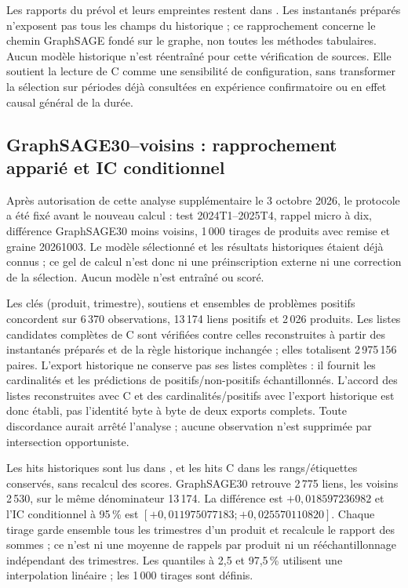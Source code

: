 Les rapports du prévol et leurs empreintes restent dans . Les instantanés préparés n'exposent pas tous les champs du  historique ; ce rapprochement concerne le chemin GraphSAGE fondé sur le graphe, non toutes les méthodes tabulaires. Aucun modèle historique n'est réentraîné pour cette vérification de sources. Elle soutient la lecture de C comme une sensibilité de configuration, sans transformer la sélection sur périodes déjà consultées en expérience confirmatoire ou en effet causal général de la durée.

\subsection{GraphSAGE30--voisins : rapprochement apparié et IC conditionnel}

Après autorisation de cette analyse supplémentaire le 3 octobre 2026, le protocole a été fixé avant le nouveau calcul : test 2024T1--2025T4, rappel micro à dix, différence GraphSAGE30 moins voisins, 1\,000 tirages de produits avec remise et graine 20261003. Le modèle sélectionné et les résultats historiques étaient déjà connus ; ce gel de calcul n'est donc ni une préinscription externe ni une correction de la sélection. Aucun modèle n'est entraîné ou scoré.

Les clés (produit, trimestre), soutiens et ensembles de problèmes positifs concordent sur 6\,370 observations, 13\,174 liens positifs et 2\,026 produits. Les listes candidates complètes de C sont vérifiées contre celles reconstruites à partir des instantanés préparés et de la règle historique inchangée ; elles totalisent 2\,975\,156 paires. L'export historique ne conserve pas ses listes complètes : il fournit les cardinalités et les prédictions de positifs/non-positifs échantillonnés. L'accord des listes reconstruites avec C et des cardinalités/positifs avec l'export historique est donc établi, pas l'identité byte à byte de deux exports complets. Toute discordance aurait arrêté l'analyse ; aucune observation n'est supprimée par intersection opportuniste.

Les hits historiques sont lus dans , et les hits C dans les rangs/étiquettes conservés, sans recalcul des scores. GraphSAGE30 retrouve 2\,775 liens, les voisins 2\,530, sur le même dénominateur 13\,174. La différence est $+0,018597236982$ et l'IC conditionnel à 95\,\% est $[+0,011975077183;+0,025570110820]$. Chaque tirage garde ensemble tous les trimestres d'un produit et recalcule le rapport des sommes ; ce n'est ni une moyenne de rappels par produit ni un rééchantillonnage indépendant des trimestres. Les quantiles à 2,5 et 97,5\,\% utilisent une interpolation linéaire ; les 1\,000 tirages sont définis.


